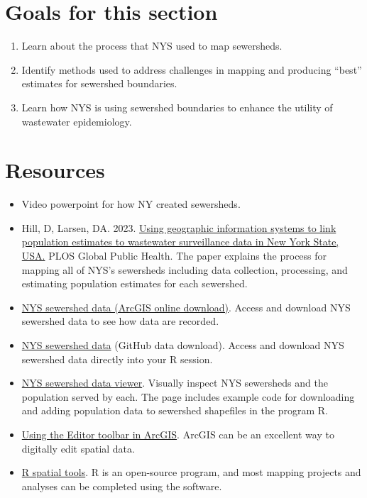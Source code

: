 \documentclass[
]{book}
\begin{document}
\hypertarget{goals-for-this-section}{%
\section{Goals for this section}\label{goals-for-this-section}}

\begin{enumerate}
\def\labelenumi{\arabic{enumi}.}
\item
  Learn about the process that NYS used to map sewersheds.
\item
  Identify methods used to address challenges in mapping and producing ``best'' estimates for sewershed boundaries.
\item
  Learn how NYS is using sewershed boundaries to enhance the utility of wastewater epidemiology.
\end{enumerate}

\hypertarget{resources}{%
\section{Resources}\label{resources}}

\begin{itemize}
\item
  Video powerpoint for how NY created sewersheds.
\item
  Hill, D, Larsen, DA. 2023. \href{https://doi.org/10.1371/journal.pgph.0001062}{Using geographic information systems to link population estimates to wastewater surveillance data in New York State, USA.} PLOS Global Public Health. The paper explains the process for mapping all of NYS's sewersheds including data collection, processing, and estimating population estimates for each sewershed.
\item
  \href{https://www.arcgis.com/home/item.html?id=e795007660ae4a1fae5f86b40d065b3a}{NYS sewershed data (ArcGIS online download)}. Access and download NYS sewershed data to see how data are recorded.
\item
  \href{https://github.com/nys-wwsn/ny-sewer-spatial-data}{NYS sewershed data} (GitHub data download). Access and download NYS sewershed data directly into your R session.
\item
  \href{https://dthill196.github.io/NY-Sewershed-Populations/}{NYS sewershed data viewer}. Visually inspect NYS sewersheds and the population served by each. The page includes example code for downloading and adding population data to sewershed shapefiles in the program R.
\item
  \href{https://desktop.arcgis.com/en/arcmap/latest/manage-data/editing-fundamentals/adding-the-editor-toolbar.htm}{Using the Editor toolbar in ArcGIS}. ArcGIS can be an excellent way to digitally edit spatial data.
\item
  \href{https://r-spatial.org/}{R spatial tools}. R is an open-source program, and most mapping projects and analyses can be completed using the software.
\end{itemize}
\end{document}
